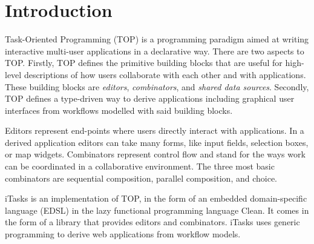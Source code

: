 
\section{Introduction}

Task-Oriented Programming (TOP) is a programming paradigm aimed at writing interactive multi-user applications in a declarative way.
There are two aspects to TOP.
Firstly, TOP defines the primitive building blocks that are useful for high-level descriptions of how users collaborate with each other and with applications.
These building blocks are \emph{editors}, \emph{combinators}, and \emph{shared data sources}.
Secondly, TOP defines a type-driven way to derive applications including graphical user interfaces from workflows modelled with said building blocks.

Editors represent end-points where users directly interact with applications.
In a derived application editors can take many forms, like input fields, selection boxes, or map widgets.
Combinators represent control flow and stand for the ways work can be coordinated in a collaborative environment.
The three most basic combinators are sequential composition, parallel composition, and choice.

iTasks is an implementation of TOP, in the form of an embedded domain-specific language (EDSL) in the lazy functional programming language Clean.
It comes in the form of a library that provides editors and combinators.
iTasks uses generic programming to derive web applications from workflow models.
